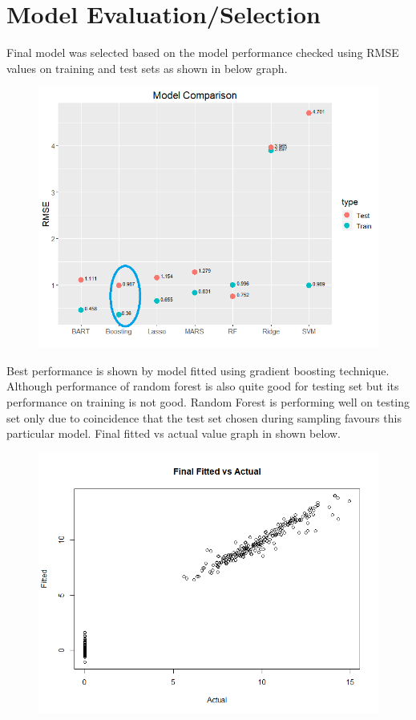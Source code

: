 \documentclass[letterpaper,12pt]{article}
\begin{document}
\section{Model Evaluation/Selection}
Final model was selected based on the model performance checked using RMSE values on training and test sets as shown in below graph.
\begin{figure}[H] 
        \centering \includegraphics[width=0.75\columnwidth]{comparision.png}
\end{figure}

Best performance is shown by model fitted using gradient boosting technique. Although performance of random forest is also quite good for testing set but its performance on training is not good. Random Forest is performing well on testing set only due to coincidence that the test set chosen during sampling favours this particular model. Final fitted vs actual value graph in shown below.
\begin{figure}[H] 
        \centering \includegraphics[width=0.75\columnwidth]{finalgraph.png}
\end{figure}
\end{document}
